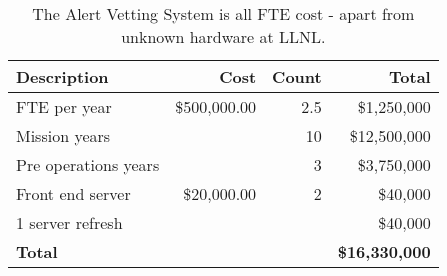 \tiny \begin{longtable} {|l|r|r|r|} \caption{The Alert Vetting System is all FTE cost - apart from unknown hardware at LLNL. \label{tab:eliminate}}\\ 
\hline 
\textbf{Description}&\textbf{Cost}&\textbf{Count}&\textbf{Total} \\ \hline
{FTE per year}&{\$500,000.00}&{2.5}&{\$1,250,000} \\ \hline
{Mission years}&{}&{10}&{\$12,500,000} \\ \hline
{Pre operations years}&{}&{3}&{\$3,750,000} \\ \hline
{Front end server}&{\$20,000.00}&{2}&{\$40,000} \\ \hline
{1 server refresh }&{}&{}&{\$40,000} \\ \hline
\textbf{Total}&\textbf{}&\textbf{}&\textbf{\$16,330,000} \\ \hline
\end{longtable} \normalsize
